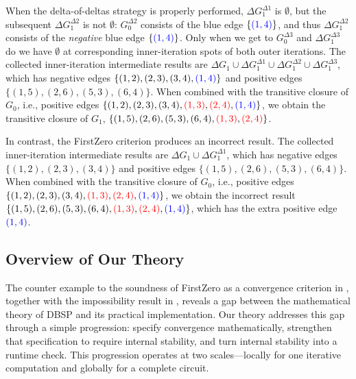 When the delta-of-deltas strategy is properly performed, $\Delta G_1^{\Delta 1}$ is $\emptyset$, but the subsequent $\Delta G_1^{\Delta 2}$ is not $\emptyset$:
$G_0^{\Delta 2}$ consists of the blue edge $\{ \textcolor{blue}{(1,4)} \}$, and thus $\Delta G_1^{\Delta 2}$ consists of the \emph{negative} blue edge $\{ \textcolor{blue}{(1,4)} \}$.
Only when we get to $G_0^{\Delta 3}$ and $\Delta G_1^{\Delta 3}$ do we have $\emptyset$ at corresponding inner-iteration spots of both outer iterations.
The collected inner-iteration intermediate results are
$\Delta G_1 \cup \Delta G_1^{\Delta 1} \cup \Delta G_1^{\Delta 2} \cup \Delta G_1^{\Delta 3}$, which has negative edges $\{ (1,2), (2,3), (3,4), \textcolor{blue}{(1,4)} \}$ and positive edges $\{ (1,5), (2,6), (5,3), (6,4) \}$.
When combined with the transitive closure of $G_0$, i.e., positive edges $\{ (1,2), (2,3), (3,4), \textcolor{red}{(1,3)}, \textcolor{red}{(2,4)}, \textcolor{blue}{(1,4)} \}$, we obtain the transitive closure of $G_1$, $\{ (1,5), (2,6), (5,3), (6,4), \textcolor{red}{(1,3)}, \textcolor{red}{(2,4)} \}$.

In contrast, the FirstZero criterion produces an incorrect result.
The collected inner-iteration intermediate results are
$\Delta G_1 \cup \Delta G_1^{\Delta 1}$, which has negative edges $\{ (1,2), (2,3), (3,4) \}$ and positive edges $\{ (1,5), (2,6), (5,3), (6,4) \}$.
When combined with the transitive closure of $G_0$, i.e., positive edges $\{ (1,2), (2,3), (3,4), \textcolor{red}{(1,3)}, \textcolor{red}{(2,4)}, \textcolor{blue}{(1,4)} \}$, we obtain the incorrect result $\{ (1,5), (2,6), (5,3), (6,4), \textcolor{red}{(1,3)}, \textcolor{red}{(2,4)}, \textcolor{blue}{(1,4)} \}$, which has the extra positive edge $\textcolor{blue}{(1,4)}$.

\subsection{Overview of Our Theory}\label{sec:overview-solution}

The counter example to the soundness of FirstZero as a convergence criterion in , together with the impossibility result in , reveals a gap between the mathematical theory of DBSP and its practical implementation. Our theory addresses this gap through a simple progression: specify convergence mathematically, strengthen that specification to require internal stability, and turn internal stability into a runtime check. This progression operates at two scales---locally for one iterative computation and globally for a complete circuit.

